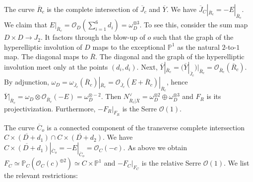 \documentclass[12pt]{amsart}
\theoremstyle{definition}
\newcommand{\bb}{\ensuremath{\mathfrak{b}}}
\newcommand{\?}{ \circled{{\large\bf ?}}}
\let\cal\mathcal
\let\bb\mathbb
\begin{document}
The curve $\overline R_c$ is the complete intersection of $\overline J_c$ and $\overline Y$. We have $\overline J_C|_{\overline R_c}=-E|_{\overline R_c}$. 
We claim that $E|_{\overline R_c}=\cal O_D(\sum_{i=1}^6d_i)=\omega_D^{\otimes 3}$. To see this, consider the sum map $D\times D\to J_2$. It factors through the blow-up of $o$ such that the graph of the hyperelliptic involution of $D$ maps to the exceptional $\bb P^1$ as the natural $2$-to-$1$ map. The diagonal maps to $\overline R$. The diagonal and the graph of the hyperelliptic involution meet only at the points $(d_i,d_i)$. Next, $\overline Y|_{\overline R_c}=(\overline Y|_{\overline J_c})|_{\overline R_c}=\cal O_{\overline R_c}(\overline R_c)$. By adjunction, $\omega_D=\omega_{\overline J_c}(\overline R_c)|_{\overline R_c}=\cal O_{\overline J_c}(E+\overline R_c)|_{\overline R_c}$, hence $\overline Y|_{\overline R_c}=\omega_D\otimes\cal O_{\overline R_c}(-E)=\omega_D^{\otimes -2}$.
Then $N_{\overline R_c|\overline X}^{\vee}=\omega_D^{\otimes 2}\oplus\omega_D^{\otimes 3}$ and $F_R$ is its projectivization. Furthermore, $-F_R|_{F_R}$ is the Serre $\cal O(1)$.

The curve $\overline C_o$ is a connected component of the transverse complete intersection $\overline{C\times(D+d_1)}\cap\overline{C\times(D+d_2)}$. We have $\overline{C\times(D+d_1)}|_{\overline C_o}=-E|_{\overline C_o}=\cal O_C(-c)$. As above we obtain $F_C\simeq\bb P_C(\cal O_C(c)^{\oplus 2})\simeq C\times\bb P^1$ and $-F_C|_{F_C}$ is the relative Serre $\cal O(1)$.
We list the relevant restrictions:
\end{document}
